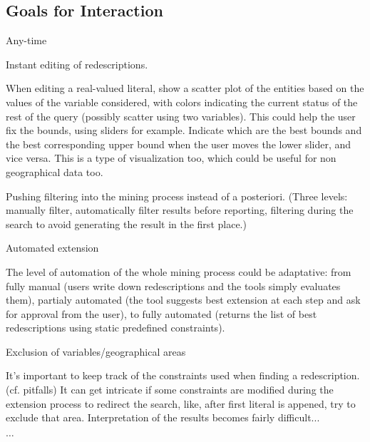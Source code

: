 \subsection{Goals for Interaction}
\label{sec:goals-interaction}

Any-time

Instant editing of redescriptions.

When editing a real-valued literal, show a scatter plot of the
entities based on the values of the variable considered, with colors
indicating the current status of the rest of the query (possibly
scatter using two variables). This could help the user fix the bounds,
using sliders for example.  Indicate which are the best bounds and the
best corresponding upper bound when the user moves the lower slider,
and vice versa.  This is a type of visualization too, which could be
useful for non geographical data too.

Pushing filtering into the mining process instead of a
posteriori. (Three levels: manually filter, automatically filter
results before reporting, filtering during the search to avoid
generating the result in the first place.)

Automated extension

The level of automation of the whole mining process could be adaptative: from fully manual (users write down redescriptions and the tools simply evaluates them), partialy automated (the tool suggests best extension at each step and ask for approval from the user), to fully automated (returns the list of best redescriptions using static predefined constraints).

Exclusion of variables/geographical areas

It's important to keep track of the constraints used when finding a
redescription. (cf. pitfalls) It can get intricate if some constraints
are modified during the extension process to redirect the search, like, after first literal is appened, try to exclude that area. Interpretation of the results becomes fairly difficult...

$\ldots$

